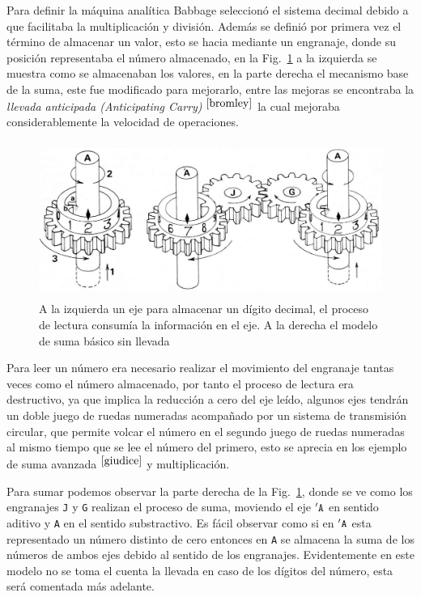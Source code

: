 \documentclass[runningheads,a4paper]{llncs}
\begin{document}
Para definir la máquina analítica Babbage seleccionó el sistema decimal debido a que facilitaba la 
multiplicación y división. Además se definió por primera vez el término de almacenar un valor, esto 
se hacia mediante un engranaje, donde su posición representaba el número almacenado, en la 
Fig.~\ref{fig:SaA} a la izquierda se muestra como se almacenaban los valores, en la parte derecha el 
mecanismo base de la suma, este fue modificado para mejorarlo, entre las mejoras se encontraba la 
\emph{llevada anticipada (Anticipating Carry)} $^{\cite{bromley}}$ la cual mejoraba considerablemente la velocidad
de operaciones.

\begin{figure}
	\centering
	\includegraphics[height=5.1cm]{imgs/SaA}
	\caption{A la izquierda un eje para almacenar un dígito decimal, el proceso de lectura consumía 
	la información en el eje. A la derecha el modelo de suma básico sin llevada}
	\label{fig:SaA}
\end{figure}

Para leer un número era necesario realizar el movimiento del engranaje tantas veces como el número 
almacenado, por tanto el proceso de lectura era destructivo, ya que implica la reducción a cero del eje 
leído, algunos ejes tendrán un doble juego de ruedas numeradas acompañado por un sistema de transmisión 
circular, que permite volcar el número en el segundo juego de ruedas numeradas al mismo tiempo que se lee 
el número del primero, esto se aprecia en los ejemplo de suma avanzada $^{\cite{giudice}}$ y multiplicación.

Para sumar podemos observar la parte derecha de la Fig.~\ref{fig:SaA}, donde se ve como los engranajes 
\verb*|J| y \verb*|G| realizan el proceso de suma, moviendo el eje $'\verb*|A|$ en sentido aditivo y \verb*|A| 
en el sentido substractivo. Es fácil observar como si en $'\verb*|A|$ esta representado un número distinto de 
cero entonces en \verb*|A| se almacena la suma de los números de ambos ejes debido al sentido de los 
engranajes. Evidentemente en este modelo no se toma el cuenta la llevada en caso de los dígitos del número, 
esta será comentada más adelante.
\end{document}
